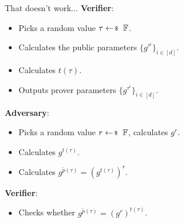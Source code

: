 \documentclass{zkdl-presentation-template}
\begin{document}
    \begin{frame}{That doesn't work...}
        \textbf{Verifier}:
        \vspace{-5pt}
        \begin{itemize}[label=]
            \item \vspace{-3pt} Picks a random value $\tau \leftarrowS \mathbb{F}$. \pause
            \item \vspace{-3pt} Calculates the public parameters $\{g^{\tau^i}\}_{i \in [d]}$. \pause
            \item \vspace{-3pt} Calculates $t(\tau)$. \pause
            \item \vspace{-3pt} Outputs prover parameters $\{g^{\tau^i}\}_{i \in [d]}$. \pause
        \end{itemize}
        \textbf{Adversary}:
        \vspace{-5pt}
        \begin{itemize}[label=]
            \item \vspace{-3pt} Picks a random value $r \leftarrowS \mathbb{F}$, calculates $g^r$. \pause
            \item \vspace{-3pt} Calculates $g^{t(\tau)}$. \pause
            \item \vspace{-3pt} Calculates $g^{\widetilde{p}(\tau)} = {\left( g^{t(\tau)} \right)}^r$. \pause
        \end{itemize}
        \textbf{Verifier}:
        \vspace{-5pt}
        \begin{itemize}[label=]
            \item \vspace{-3pt} Checks whether $g^{\widetilde{p}(\tau)} = \left( g^{r} \right)^{t(\tau)}$.
        \end{itemize}
    \end{frame}
\end{document}
